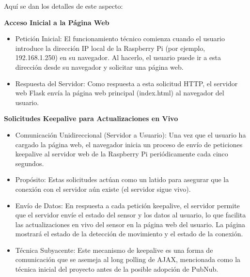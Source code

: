 \documentclass{report}
\begin{document}
Aquí se dan los detalles de este aspecto:

\textbf{Acceso Inicial a la Página Web}
\begin{itemize}
    \item Petición Inicial: El funcionamiento técnico comienza cuando el usuario introduce la dirección IP local de la Raspberry Pi 
    (por ejemplo, 192.168.1.250) en su navegador. Al hacerlo, el usuario puede ir a esta dirección desde su navegador y solicitar una página web.
    \item Respuesta del Servidor: Como respuesta a esta solicitud HTTP, el servidor web Flask envía la página web principal (index.html) 
    al navegador del usuario.
\end{itemize}

\textbf{Solicitudes Keepalive para Actualizaciones en Vivo}
\begin{itemize}
    \item Comunicación Unidireccional (Servidor a Usuario): Una vez que el usuario ha cargado la página web, el navegador inicia un proceso de envío de 
    peticiones keepalive al servidor web de la Raspberry Pi periódicamente cada cinco segundos.
    \item Propósito: Estas solicitudes actúan como un latido para asegurar que la conexión con el servidor aún existe (el servidor sigue vivo).
    \item Envío de Datos: En respuesta a cada petición keepalive, el servidor permite que el servidor envíe el estado del sensor y los datos al usuario, 
    lo que facilita las actualizaciones en vivo del sensor en la página web del usuario. La página mostrará el estado de la detección de movimiento y el 
    estado de la conexión.
    \item Técnica Subyacente: Este mecanismo de keepalive es una forma de comunicación que se asemeja al long polling de AJAX, mencionada 
    como la técnica inicial del proyecto antes de la posible adopción de PubNub.
\end{itemize}
\end{document}
